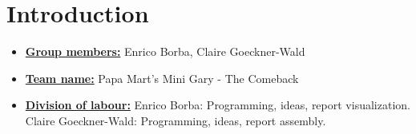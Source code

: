 
\newif\ifshowsolutions
\showsolutionstrue

\newcommand{\boldline}[1]{\underline{\textbf{#1}}}

\usepackage{graphicx}
\graphicspath{ {images/} }



\pagestyle{fancy}





\section{Introduction}
\medskip
\begin{itemize}

    \item \boldline{Group members:} Enrico Borba, Claire Goeckner-Wald
    \item \boldline{Team name:} Papa Mart's Mini Gary - The Comeback
    \item \boldline{Division of labour:}
        Enrico Borba: Programming, ideas, report visualization.
        Claire Goeckner-Wald: Programming, ideas, report assembly.

\end{itemize}


